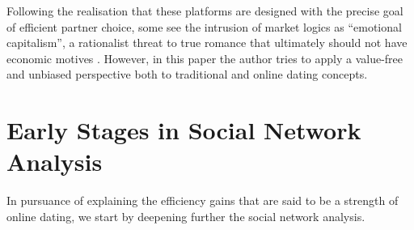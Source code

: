 Following the realisation that these platforms are designed with the
precise goal of efficient partner choice, some see the intrusion of
market logics as \textquotedblleft emotional capitalism\textquotedblright ,
a rationalist threat to true romance that ultimately should not have
economic motives \citep{Illouz2007Cold-Intimacies}. However, in this
paper the author tries to apply a value-free and unbiased perspective
both to traditional and online dating concepts.


\section{Early Stages in Social Network Analysis}

In pursuance of explaining the efficiency gains that are said to be
a strength of online dating, we start by deepening further the social
network analysis.

